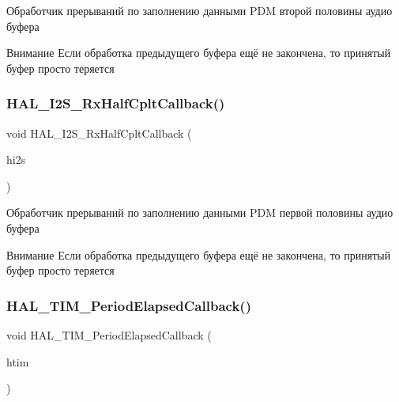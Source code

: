 Обработчик прерываний по заполнению данными P\+DM второй половины аудио буфера 



 \begin{DoxyAttention}{Внимание}
Если обработка предыдущего буфера ещё не закончена, то принятый буфер просто теряется 
\end{DoxyAttention}
\mbox{\label{group___callback_ga6c4cd3b18c42c6de0c3f4fe7068a5b12}} 
\subsubsection{\texorpdfstring{H\+A\+L\+\_\+\+I2\+S\+\_\+\+Rx\+Half\+Cplt\+Callback()}{HAL\_I2S\_RxHalfCpltCallback()}}
{\footnotesize\ttfamily void H\+A\+L\+\_\+\+I2\+S\+\_\+\+Rx\+Half\+Cplt\+Callback (\begin{DoxyParamCaption}\item[{I2\+S\+\_\+\+Handle\+Type\+Def $\ast$}]{hi2s }\end{DoxyParamCaption})}



Обработчик прерываний по заполнению данными P\+DM первой половины аудио буфера 



 \begin{DoxyAttention}{Внимание}
Если обработка предыдущего буфера ещё не закончена, то принятый буфер просто теряется 
\end{DoxyAttention}
\mbox{\label{group___callback_ga8a3b0ad512a6e6c6157440b68d395eac}} 
\subsubsection{\texorpdfstring{H\+A\+L\+\_\+\+T\+I\+M\+\_\+\+Period\+Elapsed\+Callback()}{HAL\_TIM\_PeriodElapsedCallback()}}
{\footnotesize\ttfamily void H\+A\+L\+\_\+\+T\+I\+M\+\_\+\+Period\+Elapsed\+Callback (\begin{DoxyParamCaption}\item[{T\+I\+M\+\_\+\+Handle\+Type\+Def $\ast$}]{htim }\end{DoxyParamCaption})}



